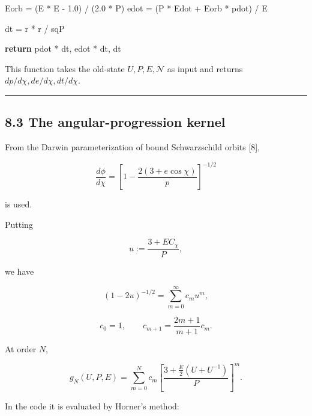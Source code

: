 \documentclass[
  a4paper,
]{article}
\newenvironment{Shaded}{}{}
\newcommand{\ControlFlowTok}[1]{\textcolor[rgb]{0.00,0.44,0.13}{\textbf{#1}}}
\newcommand{\FloatTok}[1]{\textcolor[rgb]{0.25,0.63,0.44}{#1}}
\newcommand{\NormalTok}[1]{#1}
\newcommand{\OperatorTok}[1]{\textcolor[rgb]{0.40,0.40,0.40}{#1}}
\begin{document}
\begin{Shaded}
\begin{Highlighting}[]
\NormalTok{    Eorb }\OperatorTok{=}\NormalTok{ (E }\OperatorTok{*}\NormalTok{ E }\OperatorTok{{-}} \FloatTok{1.0}\NormalTok{) }\OperatorTok{/}\NormalTok{ (}\FloatTok{2.0} \OperatorTok{*}\NormalTok{ P)}
\NormalTok{    edot }\OperatorTok{=}\NormalTok{ (P }\OperatorTok{*}\NormalTok{ Edot }\OperatorTok{+}\NormalTok{ Eorb }\OperatorTok{*}\NormalTok{ pdot) }\OperatorTok{/}\NormalTok{ E}

\NormalTok{    dt }\OperatorTok{=}\NormalTok{ r }\OperatorTok{*}\NormalTok{ r }\OperatorTok{/}\NormalTok{ sqP}

    \ControlFlowTok{return}\NormalTok{ pdot }\OperatorTok{*}\NormalTok{ dt, edot }\OperatorTok{*}\NormalTok{ dt, dt}
\end{Highlighting}
\end{Shaded}

This function takes the old-state \(U,P,E,\mathcal N\) as input and
returns \(dp/d\chi,de/d\chi,dt/d\chi\).

\begin{center}\rule{0.5\linewidth}{0.5pt}\end{center}

\subsection{8.3 The angular-progression
kernel}\label{the-angular-progression-kernel}

From the Darwin parameterization of bound Schwarzschild orbits {[}8{]},

\[
\frac{d\phi}{d\chi}
=
\left[
1-\frac{2(3+e\cos\chi)}p
\right]^{-1/2}
\]

is used.

Putting

\[
u
:=
\frac{3+EC_\chi}{P},
\]

we have

\[
(1-2u)^{-1/2}
=
\sum_{m=0}^{\infty}c_mu^m,
\]

\[
c_0=1,
\qquad
c_{m+1}=\frac{2m+1}{m+1}c_m.
\]

At order \(N\),

\[
\boxed{
g_N(U,P,E)
=\sum_{m=0}^{N}c_m
\left[
\frac{3+\frac E2(U+U^{-1})}{P}
\right]^m.
}
\]

In the code it is evaluated by Horner's method:
\end{document}

